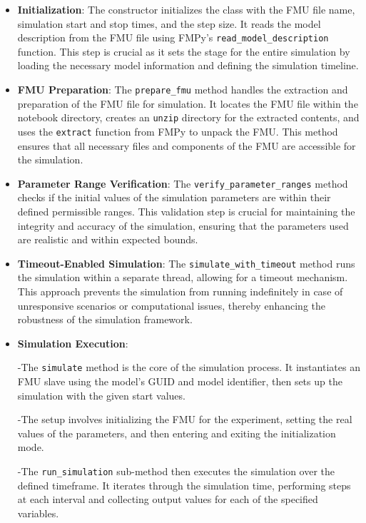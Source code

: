 \documentclass{report}
\begin{document}
\begin{itemize}
    \item \textbf{Initialization}: The constructor initializes the class with the FMU file name, simulation start and stop times, and the step size. It reads the model description from the FMU file using FMPy's \texttt{read\_model\_description} function. This step is crucial as it sets the stage for the entire simulation by loading the necessary model information and defining the simulation timeline.

    \item \textbf{FMU Preparation}: The \texttt{prepare\_fmu} method handles the extraction and preparation of the FMU file for simulation. It locates the FMU file within the notebook directory, creates an \texttt{unzip} directory for the extracted contents, and uses the \texttt{extract} function from FMPy to unpack the FMU. This method ensures that all necessary files and components of the FMU are accessible for the simulation.

    \item \textbf{Parameter Range Verification}: The \texttt{verify\_parameter\_ranges} method checks if the initial values of the simulation parameters are within their defined permissible ranges. This validation step is crucial for maintaining the integrity and accuracy of the simulation, ensuring that the parameters used are realistic and within expected bounds.

    \item \textbf{Timeout-Enabled Simulation}: The \texttt{simulate\_with\_timeout} method runs the simulation within a separate thread, allowing for a timeout mechanism. This approach prevents the simulation from running indefinitely in case of unresponsive scenarios or computational issues, thereby enhancing the robustness of the simulation framework.

    \item \textbf{Simulation Execution}:
        
    -The \texttt{simulate} method is the core of the simulation process. It instantiates an FMU slave using the model's GUID and model identifier, then sets up the simulation with the given start values.
        
        -The setup involves initializing the FMU for the experiment, setting the real values of the parameters, and then entering and exiting the initialization mode.
        
        -The \texttt{run\_simulation} sub-method then executes the simulation over the defined timeframe. It iterates through the simulation time, performing steps at each interval and collecting output values for each of the specified variables.
        

\end{itemize}
\end{document}

